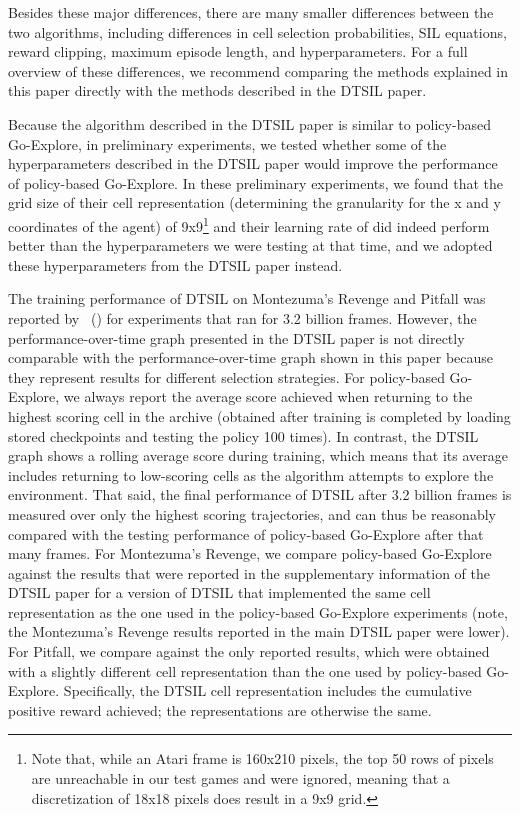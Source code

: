\documentclass{nature}
\renewcommand*{\cite}[1]{\supercite{#1}}
\newcommand{\citefull}[1]{\citeauthor{#1}~(\citeyear{#1})\cite{#1}}
\begin{document}
Besides these major differences, there are many smaller differences between the two algorithms, including differences in cell selection probabilities, SIL equations, reward clipping, maximum episode length, and hyperparameters.
For a full overview of these differences, we recommend comparing the methods explained in this paper directly with the methods described in the DTSIL paper\cite{guo2019efficient}.

Because the algorithm described in the DTSIL paper is similar to policy-based Go-Explore, in preliminary experiments, we tested whether some of the hyperparameters described in the DTSIL paper would improve the performance of policy-based Go-Explore.
In these preliminary experiments, we found that the grid size of their cell representation (determining the granularity for the x and y coordinates of the agent) of 9x9\footnote{Note that, while an Atari frame is 160x210 pixels, the top 50 rows of pixels are unreachable in our test games and were ignored, meaning that a discretization of 18x18 pixels does result in a 9x9 grid.} and their learning rate of  did indeed perform better than the hyperparameters we were testing at that time, and we adopted these hyperparameters from the DTSIL paper instead.

The training performance of DTSIL on Montezuma's Revenge and Pitfall was reported by \citefull{guo2019efficient} for experiments that ran for 3.2 billion frames.
However, the performance-over-time graph presented in the DTSIL paper is not directly comparable with the performance-over-time graph shown in this paper because they represent results for different selection strategies.
For policy-based Go-Explore, we always report the average score achieved when returning to the highest scoring cell in the archive (obtained after training is completed by loading stored checkpoints and testing the policy 100 times).
In contrast, the DTSIL graph shows a rolling average score during training, which means that its average includes returning to low-scoring cells as the algorithm attempts to explore the environment.
That said, the final performance of DTSIL after 3.2 billion frames is measured over only the highest scoring trajectories, and can thus be reasonably compared with the testing performance of policy-based Go-Explore after that many frames.
For Montezuma's Revenge, we compare policy-based Go-Explore against the results that were reported in the supplementary information of the DTSIL paper for a version of DTSIL that implemented the same cell representation as the one used in the policy-based Go-Explore experiments (note, the Montezuma's Revenge results reported in the main DTSIL paper were lower).
For Pitfall, we compare against the only reported results, which were obtained with a slightly different cell representation than the one used by policy-based Go-Explore.
Specifically, the DTSIL cell representation includes the cumulative positive reward achieved; the representations are otherwise the same.
\end{document}
